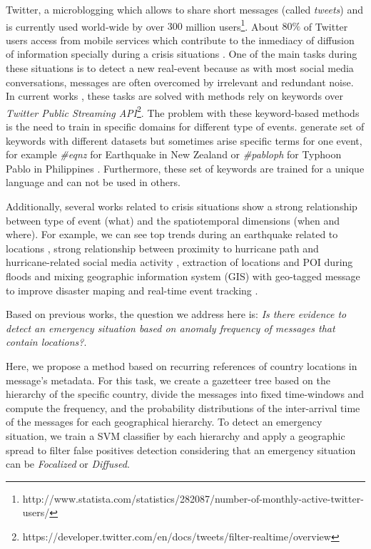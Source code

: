 \documentclass[sigconf]{acmart}
\begin{document}
Twitter, a microblogging which allows to share short messages (called \textit{tweets}) and is currently used world-wide by over $300$ million users\footnote{http://www.statista.com/statistics/282087/number-of-monthly-active-twitter-users/}. About $80\%$ of Twitter users access from mobile services which contribute to the inmediacy of diffusion of information specially during a crisis situations \cite{castillo2016big}. One of the main tasks during these situations is to detect a new real-event because as with most social media conversations, messages are often overcomed by irrelevant and redundant noise. In current works \cite{kumar2011tweettracker,caragea2011classifying,ashktorab2014tweedr,imranaidr2014,maldonado2017}, these tasks are solved with methods rely on keywords over \textit{Twitter Public Streaming API}\footnote{https://developer.twitter.com/en/docs/tweets/filter-realtime/overview}. The problem with these keyword-based methods is the need to train in specific domains for different type of events. \cite{olteanu2014} generate set of keywords with different datasets but sometimes arise specific terms for one event, for example \textit{\#eqnz} for Earthquake in New Zealand or \textit{\#pabloph} for Typhoon Pablo in Philippines \cite{potts2011tweeting,bruns2012local,karimi2013classifying}. Furthermore, these set of keywords are trained for a unique language and can not be used in others.

Additionally, several works related to crisis situations show a strong relationship between type of event (what) and the spatiotemporal dimensions (when and where). For example, we can see top trends during an earthquake related to locations \cite{mendoza2010twitter}, strong relationship between proximity to hurricane path and hurricane-related social media activity \cite{kryvasheyeu2016rapid}, extraction of locations and POI during floods \cite{lingad2013location} and mixing geographic information system (GIS) with geo-tagged message to improve disaster maping and real-time event tracking \cite{huang2015disastermapper}.

Based on previous works, the question we address here is: \textit{Is there evidence to detect an emergency situation based on anomaly frequency of messages that contain locations?}.

Here, we propose a method based on recurring references of country locations in message's metadata. For this task, we create a gazetteer tree based on the hierarchy of the specific country, divide the messages into fixed time-windows and compute the frequency, and the probability distributions of the inter-arrival time of the messages for each geographical hierarchy. To detect an emergency situation, we train a SVM classifier by each hierarchy and apply a geographic spread to filter false positives detection considering that an emergency situation can be \textit{Focalized} or \textit{Diffused}.  
\end{document}

